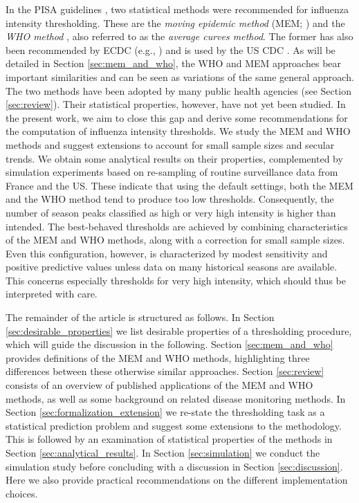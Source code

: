 \documentclass[12pt]{article}
\begin{document}
In the PISA guidelines \citep{WHO2017}, two statistical methods were recommended for influenza intensity thresholding. These are the \textit{moving epidemic method} (MEM; \citealt{Vega2015}) and the \textit{WHO method} \citep{WHO2014}, also referred to as the \textit{average curves method}. The former has also been recommended by ECDC (e.g., \citealt{ECDC2017}) and is used by the US CDC \citep{Biggerstaff2017}. As will be detailed in Section \ref{sec:mem_and_who}, the WHO and MEM approaches bear important similarities and can be seen as variations of the same general approach. The two methods have been adopted by many public health agencies (see Section \ref{sec:review}). Their statistical properties, however, have not yet been studied. In the present work, we aim to close this gap and derive some recommendations for the computation of influenza intensity thresholds. We study the MEM and WHO methods and suggest extensions to account for small sample sizes and secular trends. We obtain some analytical results on their properties, complemented by simulation experiments based on re-sampling of routine surveillance data from France and the US. These indicate that using the default settings, both the MEM and the WHO method tend to produce too low thresholds. Consequently, the number of season peaks classified as high or very high intensity is higher than intended. The best-behaved thresholds are achieved by combining characteristics of the MEM and WHO methods, along with a correction for small sample sizes. Even this configuration, however, is characterized by modest sensitivity and positive predictive values unless data on many historical seasons are available. This concerns especially thresholds for very high intensity, which should thus be interpreted with care.

The remainder of the article is structured as follows. In Section \ref{sec:desirable_properties} we list desirable properties of a thresholding procedure, which will guide the discussion in the following. Section \ref{sec:mem_and_who} provides definitions of the MEM and WHO methods, highlighting three differences between these otherwise similar approaches. Section \ref{sec:review} consists of an overview of published applications of the MEM and WHO methods, as well as some background on related disease monitoring methods. In Section \ref{sec:formalization_extension} we re-state the thresholding task as a statistical prediction problem and suggest some extensions to the methodology. This is followed by an examination of statistical properties of the methods in Section \ref{sec:analytical_results}. In Section \ref{sec:simulation} we conduct the simulation study before concluding with a discussion in Section \ref{sec:discussion}. Here we also provide practical recommendations on the different implementation choices.
\end{document}
